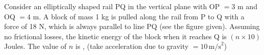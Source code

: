 

    \item Consider an elliptically shaped rail PQ in the vertical plane with OP \( = 3 \) m and OQ \( = 4 \) m. A block of mass 1 kg is pulled along the rail from P to Q with a force of 18 N, which is always parallel to line PQ (see the figure given). Assuming no frictional losses, the kinetic energy of the block when it reaches Q is \( (n \times 10) \) Joules. The value of \( n \) is \underline{\hspace{2.5 cm}}, (take acceleration due to gravity \( = 10 \, \text{m/s}^2 \))
    
    \begin{center}
    \end{center}


